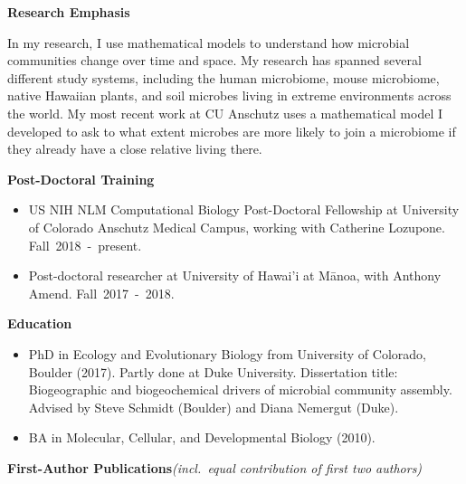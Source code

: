 \documentclass{article}
\begin{document}
%
\vspace{2mm}
%
{\large\textbf{Research Emphasis}}
\begin{adjustwidth}{5mm}{}
  In my research, I use mathematical models to understand how microbial communities change over time and space. My research has spanned several different study systems, including the human microbiome, mouse microbiome, native Hawaiian plants, and soil microbes living in extreme environments across the world. My most recent work at CU Anschutz uses a mathematical model I developed to ask to what extent microbes are more likely to join a microbiome if they already have a close relative living there.
\end{adjustwidth}
%
\vspace{2mm} 
%
{\large  \textbf{Post-Doctoral Training}}
\begin{itemize}[noitemsep,topsep=0pt, leftmargin=5mm]
  \item US NIH NLM Computational Biology Post-Doctoral Fellowship at University of Colorado Anschutz Medical Campus, working with Catherine Lozupone. \mbox{Fall 2018 - present.}
  \item Post-doctoral researcher at University of Hawai'i at Mānoa, with Anthony Amend. \mbox{Fall 2017 - 2018.}
\end{itemize}
%
\vspace{2mm}
{\large  \textbf{Education}}
\begin{itemize}[noitemsep,topsep=0pt, leftmargin=5mm]
  \item PhD in Ecology and Evolutionary Biology from University of Colorado, Boulder (2017). Partly done at Duke University. Dissertation title: Biogeographic and biogeochemical drivers of microbial community assembly. Advised by Steve Schmidt (Boulder) and Diana Nemergut (Duke). 
  \item BA in Molecular, Cellular, and Developmental Biology (2010).
\end{itemize}
\vspace{2mm}
{\large  \textbf{First-Author Publications}}\space\emph{(incl.\ equal contribution of first two authors)}
\vspace{-1em}\vspace{1mm}
\begingroup
	\setlength\bibitemsep{0pt}
	\nocite{*}
	\printbibliography[keyword=firstauthor, heading=none]
\endgroup
\vspace{-1em}\vspace{3mm}
\end{document}
